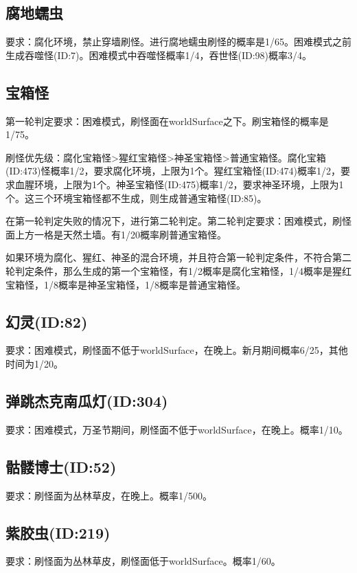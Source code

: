 \subsection{腐地蠕虫}
要求：腐化环境，禁止穿墙刷怪。进行腐地蠕虫刷怪的概率是1/65。困难模式之前生成吞噬怪(ID:7)。困难模式中吞噬怪概率1/4，吞世怪(ID:98)概率3/4。

\subsection{宝箱怪}
第一轮判定要求：困难模式，刷怪面在worldSurface之下。刷宝箱怪的概率是1/75。

刷怪优先级：腐化宝箱怪>猩红宝箱怪>神圣宝箱怪>普通宝箱怪。腐化宝箱(ID:473)怪概率1/2，要求腐化环境，上限为1个。猩红宝箱怪(ID:474)概率1/2，要求血腥环境，上限为1个。神圣宝箱怪(ID:475)概率1/2，要求神圣环境，上限为1个。这三个环境宝箱怪都不生成，则生成普通宝箱怪(ID:85)。

在第一轮判定失败的情况下，进行第二轮判定。第二轮判定要求：困难模式，刷怪面上方一格是天然土墙。有1/20概率刷普通宝箱怪。

\begin{remark}
如果环境为腐化、猩红、神圣的混合环境，并且符合第一轮判定条件，不符合第二轮判定条件，那么生成的第一个宝箱怪，有1/2概率是腐化宝箱怪，1/4概率是猩红宝箱怪，1/8概率是神圣宝箱怪，1/8概率是普通宝箱怪。
\end{remark}

\subsection{幻灵(ID:82)}
要求：困难模式，刷怪面不低于worldSurface，在晚上。新月期间概率6/25，其他时间为1/20。

\subsection{弹跳杰克南瓜灯(ID:304)}
要求：困难模式，万圣节期间，刷怪面不低于worldSurface，在晚上。概率1/10。

\subsection{骷髅博士(ID:52)}
要求：刷怪面为丛林草皮，在晚上。概率1/500。

\subsection{紫胶虫(ID:219)}
要求：刷怪面为丛林草皮，刷怪面低于worldSurface。概率1/60。

